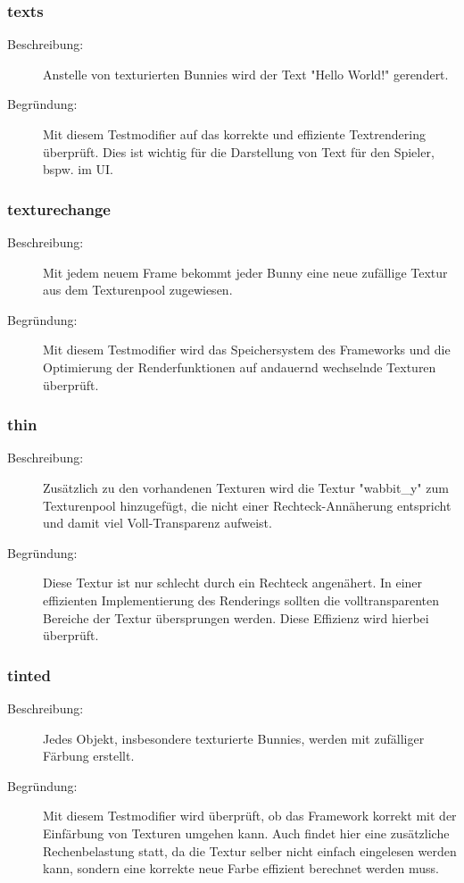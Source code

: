 \subsubsection{texts}
\begin{description}
\item[Beschreibung:] Anstelle von texturierten Bunnies wird der Text "Hello World!" gerendert. \\
\item[Begründung:] Mit diesem Testmodifier auf das korrekte und effiziente Textrendering überprüft. Dies ist wichtig für die Darstellung von Text für den Spieler, bspw. im UI.
\end{description}

\subsubsection{texturechange}
\begin{description}
\item[Beschreibung:] Mit jedem neuem Frame bekommt jeder Bunny eine neue zufällige Textur aus dem Texturenpool zugewiesen. \\
\item[Begründung:] Mit diesem Testmodifier wird das Speichersystem des Frameworks und die Optimierung der Renderfunktionen auf andauernd wechselnde Texturen überprüft.
\end{description}

\subsubsection{thin}
\begin{description}
\item[Beschreibung:] Zusätzlich zu den vorhandenen Texturen wird die Textur "wabbit\_y" zum Texturenpool hinzugefügt, die nicht einer Rechteck-Annäherung entspricht und damit viel Voll-Transparenz aufweist. \\
\item[Begründung:] Diese Textur ist nur schlecht durch ein Rechteck angenähert. In einer effizienten Implementierung des Renderings sollten die volltransparenten Bereiche der Textur übersprungen werden. Diese Effizienz wird hierbei überprüft.
\end{description}

\subsubsection{tinted}
\begin{description}
\item[Beschreibung:] Jedes Objekt, insbesondere texturierte Bunnies, werden mit zufälliger Färbung erstellt. \\
\item[Begründung:] Mit diesem Testmodifier wird überprüft, ob das Framework korrekt mit der Einfärbung von Texturen umgehen kann. Auch findet hier eine zusätzliche Rechenbelastung statt, da die Textur selber nicht einfach eingelesen werden kann, sondern eine korrekte neue Farbe effizient berechnet werden muss.
\end{description}

